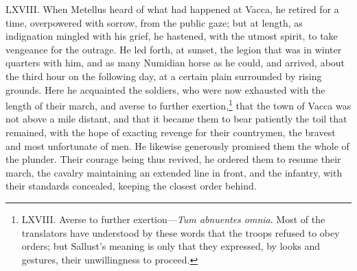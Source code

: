 LXVIII. When Metellus heard of what had happened at Vacca, he retired
for a time, overpowered with sorrow, from the public gaze; but at
length, as indignation mingled with his grief, he hastened, with the
utmost spirit, to take vengeance for the outrage. He led forth, at
sunset, the legion that was in winter quarters with him, and as many
Numidian horse as he could, and arrived, about the third hour on the
following day, at a certain plain surrounded by rising grounds. Here
he acquainted the soldiers, who were now exhausted with the length of
their march, and averse to further exertion,\footnote{LXVIII. Averse to further exertion—\emph{Tum abnuentes omnia}.
Most of the translators have understood by these words that the troops
refused to obey orders; but Sallust's meaning is only that they
expressed, by looks and gestures, their unwillingness to proceed.} that the town of
Vacca was not above a mile distant, and that it became them to bear
patiently the toil that remained, with the hope of exacting revenge for
their countrymen, the bravest and most unfortunate of men. He likewise
generously promised them the whole of the plunder. Their courage being
thus revived, he ordered them to resume their march, the cavalry
maintaining an extended line in front, and the infantry, with their
standards concealed, keeping the closest order behind.

